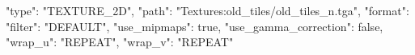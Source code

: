 {
	"type": "TEXTURE_2D",
	"path": "Textures:old_tiles/old_tiles_n.tga",
	"format": {
		"filter": "DEFAULT",
		"use_mipmaps": true,
		"use_gamma_correction": false,
		"wrap_u": "REPEAT",
		"wrap_v": "REPEAT"
	}
}